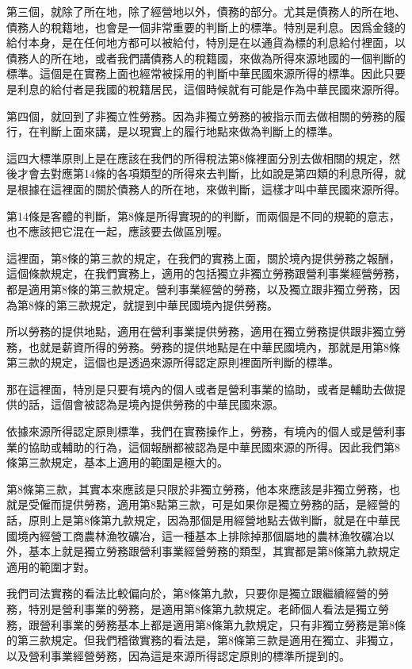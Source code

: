 \documentclass[]{ctexbook}
\begin{document}
第三個，就除了所在地，除了經營地以外，債務的部分。尤其是債務人的所在地、債務人的稅籍地，也會是一個非常重要的判斷上的標準。特別是利息。因爲金錢的給付本身，是在任何地方都可以被給付，特別是在以通貨為標的利息給付裡面，以債務人的所在地，或者我們講債務人的稅籍國，來做為所得來源地國的一個判斷的標準。這個是在實務上面也經常被採用的判斷中華民國來源所得的標準。因此只要是利息的給付者是我國的稅籍居民，這個時候就有可能是作為中華民國來源所得。

第四個，就回到了非獨立性勞務。因為非獨立勞務的被指示而去做相關的勞務的履行，在判斷上面來講，是以現實上的履行地點來做為判斷上的標準。

這四大標準原則上是在應該在我們的所得稅法第8條裡面分別去做相關的規定，然後才會去對應第14條的各項類型的所得來去判斷，比如說是第四類的利息所得，就是根據在這裡面的關於債務人的所在地，來做判斷，這樣才叫中華民國來源所得。

第14條是客體的判斷，第8條是所得實現的的判斷，而兩個是不同的規範的意志，也不應該把它混在一起，應該要去做區別喔。

這裡面，第8條的第三款的規定，在我們的實務上面，關於境內提供勞務之報酬，這個條款規定，在我們實務上，適用的包括獨立非獨立勞務跟營利事業經營勞務，都是適用第8條的第三款規定。營利事業經營的勞務，以及獨立跟非獨立勞務，因為第8條的第三款規定，就提到中華民國境內提供勞務。

所以勞務的提供地點，適用在營利事業提供勞務，適用在獨立勞務提供跟非獨立勞務，也就是薪資所得的勞務。勞務的提供地點是在中華民國境內，那就是用第8條第三款的規定，這個也是透過來源所得認定原則裡面所判斷的標準。

那在這裡面，特別是只要有境內的個人或者是營利事業的協助，或者是輔助去做提供的話，這個會被認為是境內提供勞務的中華民國來源。

依據來源所得認定原則標準，我們在實務操作上，勞務，有境內的個人或是營利事業的協助或輔助的行為，這個報酬都被認為是中華民國來源的所得。因此我們第8條第三款規定，基本上適用的範圍是極大的。

第8條第三款，其實本來應該是只限於非獨立勞務，他本來應該是非獨立勞務，也就是受僱而提供勞務，適用第8點第三款，可是如果你是獨立勞務的話，是經營的話，原則上是第8條第九款規定，因為那個是用經營地點去做判斷，就是在中華民國境內經營工商農林漁牧礦冶，這一種基本上排除掉那個屬地的農林漁牧礦冶以外，基本上就是獨立勞務跟營利事業經營勞務的類型，其實都是第8條第九款規定適用的範圍才對。

我們司法實務的看法比較偏向於，第8條第九款，只要你是獨立跟繼續經營的勞務，特別是營利事業的勞務，是適用第8條第九款規定。老師個人看法是獨立勞務，跟營利事業的勞務基本上都是適用第8條第九款規定，只有非獨立勞務是第8條的第三款規定。但我們稽徵實務的看法是，第8條第三款是適用在獨立、非獨立，以及營利事業經營勞務，因為這是來源所得認定原則的標準所提到的。
\end{document}
